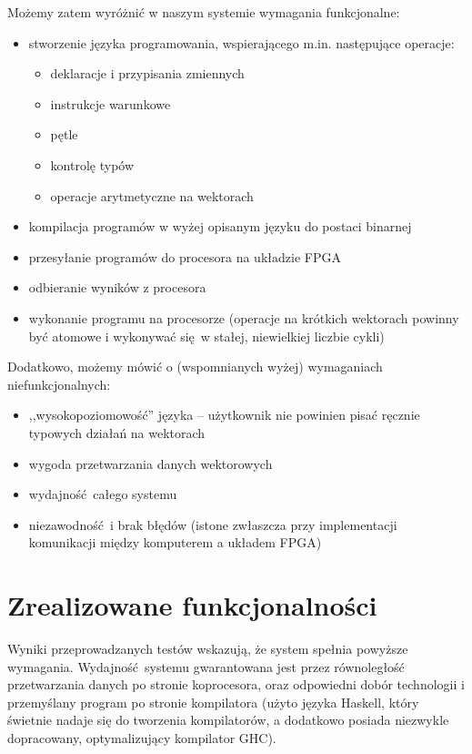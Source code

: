 Możemy zatem wyróżnić w naszym systemie wymagania funkcjonalne:
\begin{itemize}
  \item stworzenie języka programowania, wspierającego m.in. następujące operacje:
  \begin{itemize}
    \item deklaracje i przypisania zmiennych
    \item instrukcje warunkowe
    \item pętle
    \item kontrolę typów
    \item operacje arytmetyczne na wektorach
  \end{itemize}
  \item kompilacja programów w wyżej opisanym języku do postaci binarnej
  \item przesyłanie programów do procesora na układzie FPGA
  \item odbieranie wyników z procesora
  \item wykonanie programu na procesorze (operacje na krótkich wektorach powinny być atomowe i wykonywać się w stałej, niewielkiej liczbie cykli)
\end{itemize}

Dodatkowo, możemy mówić o (wspomnianych wyżej) wymaganiach niefunkcjonalnych:
\begin{itemize}
  \item ,,wysokopoziomowość'' języka -- użytkownik nie powinien pisać ręcznie typowych działań na wektorach
  \item wygoda przetwarzania danych wektorowych
  \item wydajność całego systemu
  \item niezawodność i brak błędów (istone zwłaszcza przy implementacji komunikacji między komputerem a układem FPGA)
\end{itemize}

\section{Zrealizowane funkcjonalności}
Wyniki przeprowadzanych testów wskazują, że system spełnia powyższe wymagania. Wydajność systemu gwarantowana jest przez równoległość przetwarzania danych po stronie koprocesora, oraz odpowiedni dobór technologii i przemyślany program po stronie kompilatora (użyto języka Haskell, który świetnie nadaje się do tworzenia kompilatorów, a dodatkowo posiada niezwykle dopracowany, optymalizujący kompilator GHC).


